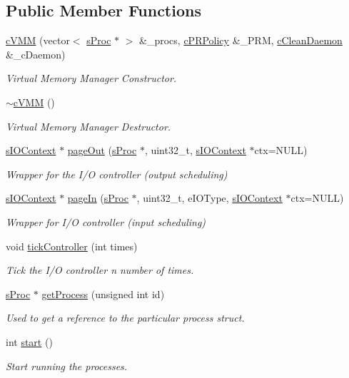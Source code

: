 \subsection*{\-Public \-Member \-Functions}
\begin{DoxyCompactItemize}
\item 
\hyperlink{classcVMM_a21cec43e5564ad3f79163dc554c89619}{c\-V\-M\-M} (vector$<$ \hyperlink{structsProc}{s\-Proc} $\ast$ $>$ \&\-\_\-procs, \hyperlink{classcPRPolicy}{c\-P\-R\-Policy} \&\-\_\-\-P\-R\-M, \hyperlink{classcCleanDaemon}{c\-Clean\-Daemon} \&\-\_\-c\-Daemon)
\begin{DoxyCompactList}\small\item\em \-Virtual \-Memory \-Manager \-Constructor. \end{DoxyCompactList}\item 
\hyperlink{classcVMM_a0c10d85db9c06944f5b4d4355efbd1f8}{$\sim$c\-V\-M\-M} ()
\begin{DoxyCompactList}\small\item\em \-Virtual \-Memory \-Manager \-Destructor. \end{DoxyCompactList}\item 
\hyperlink{structsIOContext}{s\-I\-O\-Context} $\ast$ \hyperlink{classcVMM_a7d58d9b5feb4f5c9ad547ca99c273b00}{page\-Out} (\hyperlink{structsProc}{s\-Proc} $\ast$, uint32\-\_\-t, \hyperlink{structsIOContext}{s\-I\-O\-Context} $\ast$ctx=\-N\-U\-L\-L)
\begin{DoxyCompactList}\small\item\em \-Wrapper for the \-I/\-O controller (output scheduling) \end{DoxyCompactList}\item 
\hyperlink{structsIOContext}{s\-I\-O\-Context} $\ast$ \hyperlink{classcVMM_a58c0522147951be596b9478f2d5a13f8}{page\-In} (\hyperlink{structsProc}{s\-Proc} $\ast$, uint32\-\_\-t, e\-I\-O\-Type, \hyperlink{structsIOContext}{s\-I\-O\-Context} $\ast$ctx=\-N\-U\-L\-L)
\begin{DoxyCompactList}\small\item\em \-Wrapper for \-I/\-O controller (input scheduling) \end{DoxyCompactList}\item 
void \hyperlink{classcVMM_a21ed6add6192ccf7fe8943c40f95b129}{tick\-Controller} (int times)
\begin{DoxyCompactList}\small\item\em \-Tick the \-I/\-O controller n number of times. \end{DoxyCompactList}\item 
\hyperlink{structsProc}{s\-Proc} $\ast$ \hyperlink{classcVMM_af307a5815558b71c9d0de57d8773e243}{get\-Process} (unsigned int id)
\begin{DoxyCompactList}\small\item\em \-Used to get a reference to the particular process struct. \end{DoxyCompactList}\item 
int \hyperlink{classcVMM_adc084e37fff4572dfe4d27619295b59f}{start} ()
\begin{DoxyCompactList}\small\item\em \-Start running the processes. \end{DoxyCompactList}\end{DoxyCompactItemize}
